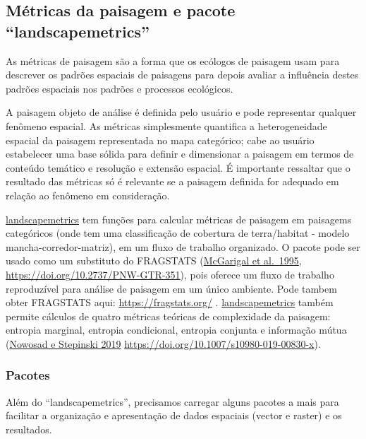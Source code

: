 \documentclass[
]{article}
\begin{document}
\newpage

\hypertarget{muxe9tricas-da-paisagem-e-pacote-landscapemetrics}{%
\subsection{Métricas da paisagem e pacote ``landscapemetrics''}\label{muxe9tricas-da-paisagem-e-pacote-landscapemetrics}}

As métricas de paisagem são a forma que os ecólogos de paisagem usam para descrever os padrões espaciais de paisagens para depois avaliar a influência destes padrões espaciais nos padrões e processos ecológicos.

A paisagem objeto de análise é definida pelo usuário e pode representar qualquer fenômeno espacial. As métricas simplesmente quantifica a heterogeneidade espacial da paisagem representada no mapa categórico; cabe ao usuário estabelecer uma base sólida para definir e dimensionar a paisagem em termos de conteúdo temático e resolução e extensão espacial. É importante ressaltar que o resultado das métricas só é relevante se a paisagem definida for adequado em relação ao fenômeno em consideração.

\href{https://r-spatialecology.github.io/landscapemetrics/}{landscapemetrics} tem funções para calcular métricas de paisagem em paisagems categóricos (onde tem uma classificação de cobertura de terra/habitat - modelo mancha-corredor-matriz), em um fluxo de trabalho organizado. O pacote pode ser usado como um substituto do FRAGSTATS (\href{https://doi.org/10.2737/PNW-GTR-351}{McGarigal et al.~1995}, \url{https://doi.org/10.2737/PNW-GTR-351}), pois oferece um fluxo de trabalho reproduzível para análise de paisagem em um único ambiente. Pode tambem obter FRAGSTATS aqui: \url{https://fragstats.org/} .
\href{https://r-spatialecology.github.io/landscapemetrics/}{landscapemetrics} também permite cálculos de quatro métricas teóricas de complexidade da paisagem: entropia marginal, entropia condicional, entropia conjunta e informação mútua (\href{https://doi.org/10.1007/s10980-019-00830-x}{Nowosad e Stepinski 2019} \url{https://doi.org/10.1007/s10980-019-00830-x}).

\hypertarget{pacotes-1}{%
\subsubsection{Pacotes}\label{pacotes-1}}

Além do ``landscapemetrics'', precisamos carregar alguns pacotes a mais para facilitar a organização e apresentação de dados espaciais (vector e raster) e os resultados.
\end{document}
